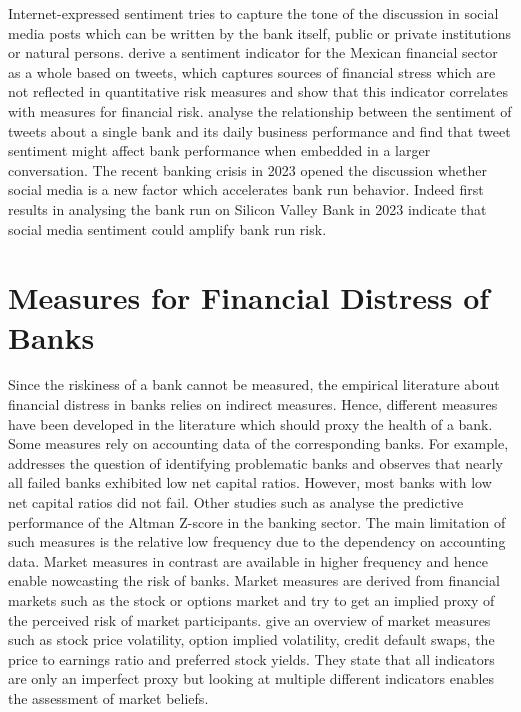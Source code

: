  Internet-expressed sentiment tries to capture the tone of the discussion in social media posts which can be written by the bank itself, public or private institutions or natural persons. \cite{fernandez2021} derive a sentiment indicator for the Mexican financial sector as a whole based on tweets, which captures sources of financial stress which are not reflected in quantitative risk measures and show that this indicator correlates with measures for financial risk. \cite{illia2021} analyse the relationship between the sentiment of tweets about a single bank and its daily business performance and find that tweet sentiment might affect bank performance when embedded in a larger conversation. The recent banking crisis in 2023 opened the discussion whether social media is a new factor which accelerates bank run behavior. Indeed first results in \cite{cookson2023} analysing the bank run on Silicon Valley Bank in 2023 indicate that social media sentiment could amplify bank run risk.

\section{Measures for Financial Distress of Banks}



Since the riskiness of a bank cannot be measured, the empirical literature about financial distress in banks relies on indirect measures. Hence, different measures have been developed in the literature which should proxy the health of a bank. Some measures rely on accounting data of the corresponding banks. For example, \cite{sinkey1978} addresses the question of identifying problematic banks and observes that nearly all failed banks exhibited low net capital ratios. However, most banks with low net capital ratios did not fail. Other studies such as \cite{chiaramonte2016} analyse the predictive performance of the Altman Z-score in the banking sector. The main limitation of such measures is the relative low frequency due to the dependency on accounting data. Market measures in contrast are available in higher frequency and hence enable nowcasting the risk of banks. Market measures are derived from financial markets such as the stock or options market and try to get an implied proxy of the perceived risk of market participants. \cite{sarin2016} give an overview of market measures such as stock price volatility, option implied volatility, credit default swaps, the price to earnings ratio and preferred stock yields. They state that all indicators are only an imperfect proxy but looking at multiple different indicators enables the assessment of market beliefs.

